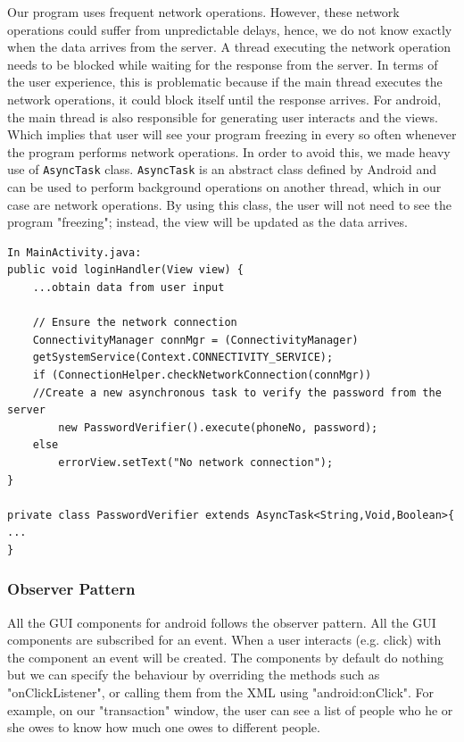 \documentclass[a4paper,11pt]{article}
\begin{document}
Our program uses frequent network operations. However, these network operations could suffer from unpredictable delays, hence, we do not know exactly when the data arrives from the server. A thread executing the network operation needs to be blocked while waiting for the response from the server. In terms of the user experience, this is problematic because if the main thread executes the network operations, it could block itself until the response arrives. For android, the main thread is also responsible for generating user interacts and the views. Which implies that user will see your program freezing in every so often whenever the program performs network operations. In order to avoid this, we made heavy use of \texttt{AsyncTask} class. \texttt{AsyncTask} is an abstract class defined by Android and can be used to perform background operations on another thread, which in our case are network operations. By using this class, the user will not need to see the program "freezing"; instead, the view will be updated as the data arrives.     
  \begin{verbatim}
In MainActivity.java:
public void loginHandler(View view) {
    ...obtain data from user input

    // Ensure the network connection
    ConnectivityManager connMgr = (ConnectivityManager) 
    getSystemService(Context.CONNECTIVITY_SERVICE);
    if (ConnectionHelper.checkNetworkConnection(connMgr))
    //Create a new asynchronous task to verify the password from the server
        new PasswordVerifier().execute(phoneNo, password);
    else
        errorView.setText("No network connection");
}

private class PasswordVerifier extends AsyncTask<String,Void,Boolean>{
...
}
 \end{verbatim}
 
\subsubsection*{Observer Pattern}

All the GUI components for android follows the observer pattern. All the GUI components are subscribed for an event. When a user interacts (e.g. click) with the component an event will be created. The components by default do nothing but we can specify the behaviour by overriding the methods such as "onClickListener", or calling them from the XML using "android:onClick". For example, on our "transaction" window, the user can see a list of people who he or she owes to know how much one owes to different people.  
\end{document}
